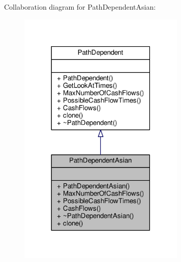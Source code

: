Collaboration diagram for Path\+Dependent\+Asian\+:
\nopagebreak
\begin{figure}[H]
\begin{center}
\leavevmode
\includegraphics[width=225pt]{classPathDependentAsian__coll__graph}
\end{center}
\end{figure}
